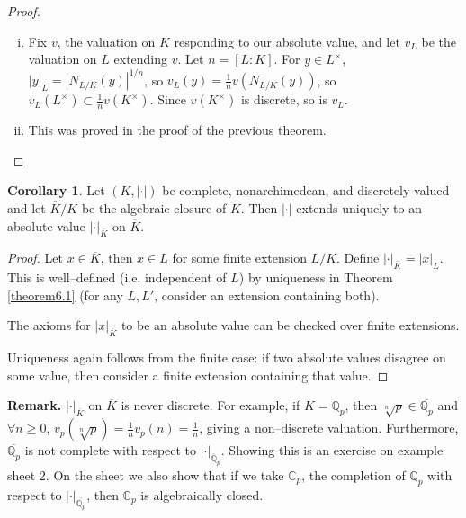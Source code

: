 \documentclass{article}
\theoremstyle{definition}
\newtheorem{cor}[theorem]{Corollary}
\begin{document}
\begin{proof}
    \begin{enumerate}[(i)]
        \item Fix $v$, the valuation on $K$ responding to our absolute value, and let $v_L$ be the valuation on $L$ extending $v$. Let $n = [L:K]$. For $y \in L^\times$, $|y|_L = |N_{L/K}(y)|^{1/n}$, so $v_L(y)=\frac{1}{n}v(N_{L/K}(y))$, so $v_L(L^\times) \subset \frac{1}{n}v(K^{\times})$. Since $v(K^\times)$ is discrete, so is $v_L$.
        \item This was proved in the proof of the previous theorem.
    \end{enumerate}
\end{proof}
\begin{cor}
    Let $(K, |\cdot|)$ be complete, nonarchimedean, and discretely valued and let $\overline{K}/K$ be the algebraic closure of $K$. Then $|\cdot|$ extends uniquely to an absolute value $|\cdot|_{\overline{K}}$ on $\overline{K}$.
\end{cor}
\begin{proof}
    Let $x \in \overline{K}$, then $x \in L$ for some finite extension $L/K$. Define $|\cdot|_{\overline{K}} = |x|_L$. This is well--defined (i.e. independent of $L$) by uniqueness in Theorem \ref{theorem6.1} (for any $L,L'$, consider an extension containing both).
    \vspace{1mm}
     
    The axioms for $|x|_{\overline{K}}$ to be an absolute value can be checked over finite extensions.
    \vspace{1mm}
     
    Uniqueness again follows from the finite case: if two absolute values disagree on some value, then consider a finite extension containing that value.
\end{proof}
\textbf{Remark.} $|\cdot|_{\overline{K}}$ on $\overline{K}$ is never discrete. For example, if $K = \mathbb{Q}_p$, then $\sqrt[n]{p} \in \overline{\mathbb{Q}_p}$ and $\forall n\ge 0$, $v_p(\sqrt[n]{p}) = \frac{1}{n}v_p(n) = \frac{1}{n}$, giving a non--discrete valuation. Furthermore, $\overline{\mathbb{Q}_p}$ is not complete with respect to $|\cdot |_{\overline{\mathbb{Q}}_p}$. Showing this is an exercise on example sheet 2. On the sheet we also show that if we take $\mathbb{C}_p$, the completion of $\overline{\mathbb{Q}_p}$ with respect to $|\cdot|_{\overline{\mathbb{Q}_p}}$, then $\mathbb{C}_p$ is algebraically closed.
\end{document}
